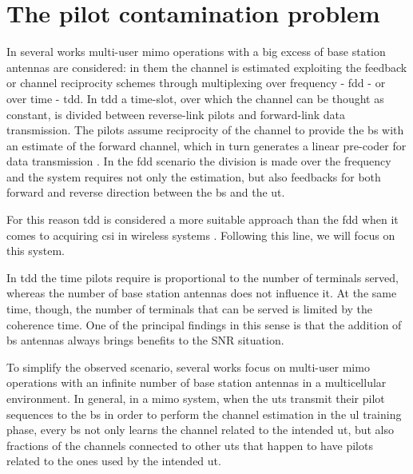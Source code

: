 \documentclass[11pt]{book}
\begin{document}
\section{The pilot contamination problem}
In several works multi-user \gls{mimo} operations with a big excess of base station antennas are considered: in them the channel is estimated exploiting the feedback or channel reciprocity schemes through multiplexing over frequency - \gls{fdd} - or over time - \gls{tdd}. In \gls{tdd} a time-slot, over which the channel can be thought as constant, is divided between reverse-link pilots and forward-link data transmission. The pilots assume reciprocity of the channel to provide the \gls{bs} with an estimate of the forward channel, which in turn generates a linear pre-coder for data transmission \cite{Marzetta2010}. In the \gls{fdd} scenario the division is made over the frequency and the system requires not only the estimation, but also feedbacks for both forward and reverse direction between the \gls{bs} and the \gls{ut}.

For this reason \gls{tdd} is considered a more suitable approach than the \gls{fdd} when it comes to acquiring \gls{csi} in wireless systems \cite{Elijah2016}. Following this line, we will focus on this system.

In \gls{tdd} the time pilots require is proportional to the number of terminals served, whereas the number of base station antennas does not influence it. At the same time, though, the number of terminals that can be served is limited by the coherence time. One of the principal findings in this sense is that the addition of \gls{bs} antennas always brings benefits to the SNR situation.

To simplify the observed scenario, several works focus on multi-user \gls{mimo} operations with an infinite number of base station antennas in a multicellular environment. In general, in a \gls{mimo} system, when the \gls{ut}s transmit their pilot sequences to the \gls{bs} in order to perform the channel estimation in the \gls{ul} training phase, every \gls{bs} not only learns the channel related to the intended \gls{ut}, but also fractions of the channels connected to other \gls{ut}s that happen to have pilots related to the ones used by the intended \gls{ut}.

\end{document}
